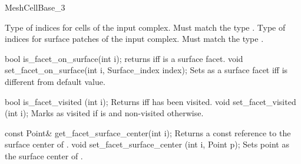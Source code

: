 \begin{ccRefConcept}{MeshCellBase_3}

{Type of indices for cells of the input complex. Must match the type .}
\ccGlue
{}
{Type of indices for surface patches of the input complex. Must match the type .}


\ccOperations



\ccMethod
{bool is_facet_on_surface(int i);}
{returns  iff  is a surface facet. }
\ccGlue
\ccMethod
{void set_facet_on_surface(int i, Surface_index index);}
{Sets  as a surface facet  iff  is
  different from  default value.}

\ccMethod
{bool is_facet_visited (int i);}
{Returns  iff  has been visited.}
\ccGlue
\ccMethod
{void set_facet_visited (int i);} 
{Marks  as visited if  is 
 and non-visited otherwise.}

\ccMethod
{const Point& get_facet_surface_center(int i);}
{Returns a const reference to the surface center of .}
\ccGlue
\ccMethod
{void set_facet_surface_center (int i, Point p);} 
{Sets point  as the surface center of .}


\ccHasModels
{}


\ccSeeAlso

 \\
 \\

\end{ccRefConcept}

\ccRefPageEnd

